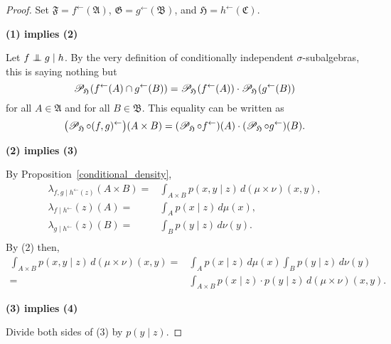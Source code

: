 \documentclass[
twoside=true,
paper=letter,
fontsize=11pt,
pagesize=auto,
leqno,
openany,
headsepline,
overfullrule,
]{scrbook}
\theoremstyle{plain}
\theoremstyle{plain}
\theoremstyle{definition}
\theoremstyle{bfnoteitalic}
\theoremstyle{bfnoteroman}
\newcommand{\sigalg}[1]{\mathfrak{#1}}
\newcommand{\cali}[1]{\mathscr{#1}}
\newcommand{\condprobsub}[2]
{\mathop{\cali{P}\hspace{-1.5pt}}\nolimits_{#2}\hspace{-1pt}\left(#1\right)}
\newcommand{\condprobop}[1]{\mathop{\cali{P}\hspace{-1pt}}\nolimits_{#1}}
\newcommand{\textsigma}{\hbox{\large{$\sigma$}}\kern-1pt}
\newcommand{\preimage}[1]{#1^{\leftarrow}}
\newcommand{\meets}{\cap}
\newcommand{\sigmaalgebra}{\sigalg{A}}
\newcommand{\sigmaalgebraii}{\sigalg{B}}
\newcommand{\sigmaalgebraiii}{\sigalg{C}}
\newcommand{\funcf}{f}
\newcommand{\funcg}{g}
\newcommand{\funch}{h}
\newcommand{\function}{f}
\newcommand{\functionii}{g}
\newcommand{\functioniii}{h}
\newcommand{\mspaceelt}{x}
\newcommand{\mspaceeltii}{y}
\newcommand{\mspaceeltiii}{z}
\newcommand{\measmu}{\mu}
\newcommand{\measnu}{\nu}
\newcommand{\measureiii}{\lambda}
\newcommand{\measlambda}{\lambda}
\newcommand{\seti}{A}
\newcommand{\setii}{B}
\newcommand{\mkernel}[3]{#1_{#2\mid#3}}
\newcommand{\condindep}[3]{#1\perp\kern-6pt\perp #2\mid #3}
\begin{document}
\begin{proof}
Set 
$\sigalg{F}=\preimage{\funcf}(\sigmaalgebra)$, 
$\sigalg{G}=\preimage{\funcg}(\sigmaalgebraii)$, and 
$\sigalg{H}=\preimage{\funch}(\sigmaalgebraiii)$.
 
\noindent
\textbf{(1) implies (2)}

Let
$\condindep{\function}{\functionii}{\functioniii}$. 
By the very definition of conditionally independent \textsigma\hyp{}subalgebras,
this is saying nothing but
\begin{equation}\label{conditional_probabilities}
\condprobsub{\preimage{\funcf}(\seti) \meets \preimage{\funcg}(\setii)}{\sigalg{H}}
=
\condprobsub{\preimage{\funcf}(\seti)}{\sigalg{H}}
\cdot
\condprobsub{\preimage{\funcg}(\setii)}{\sigalg{H}}
\end{equation}
for all $\seti\in\sigmaalgebra$ and for all $\setii\in\sigmaalgebraii$.
This equality can be written as
\begin{equation}\label{conditional_distributions}
\bigl(\condprobop{\sigalg{H}} \circ \preimage{(\funcf,\funcg)} \bigr)
(\seti\times\setii)
=
(\condprobop{\sigalg{H}}\circ \preimage{\funcf})(\seti)
\cdot
(\condprobop{\sigalg{H}}\circ \preimage{\funcg})(\setii).
\end{equation}

\noindent
\textbf{(2) implies (3)}

By Proposition~\ref{conditional_density},
\begin{align*}
\mkernel{\measureiii}{\funcf,\funcg}{\preimage{\funch}(\mspaceeltiii)}
(\seti\times\setii)
= &
\int_{\seti\times\setii}
p(\mspaceelt,\mspaceeltii\mid\mspaceeltiii)
\,d(\measmu\times\measnu)(\mspaceelt,\mspaceeltii),
\\
\mkernel{\measlambda}{\funcf}{\preimage{\funch}}(\mspaceeltiii)
(\seti)
= &
\int_\seti p(\mspaceelt\mid\mspaceeltiii)
\, d\measmu(\mspaceelt),
\\
\mkernel{\measlambda}{\funcg}{\preimage{\funch}}(\mspaceeltiii)
(\setii)
= &
\int_\setii p(\mspaceeltii\mid\mspaceeltiii)
\, d\measnu(\mspaceeltii).
\\
\end{align*}
By (2) then,
\begin{align*}
\int_{\seti\times\setii}
p(\mspaceelt,\mspaceeltii\mid\mspaceeltiii)
\,d(\measmu\times\measnu)(\mspaceelt,\mspaceeltii)
= &
\int_\seti p(\mspaceelt\mid\mspaceeltiii)
\, d\measmu(\mspaceelt)
\int_\setii p(\mspaceeltii\mid\mspaceeltiii)
\, d\measnu(\mspaceeltii)
\\
= &
\int_{\seti\times\setii}
p(\mspaceelt\mid\mspaceeltiii)\cdot
p(\mspaceeltii\mid\mspaceeltiii)
\, d(\measmu\times\measnu)(\mspaceelt,\mspaceeltii).
\end{align*}

\noindent
\textbf{(3) implies (4)}

Divide both sides of (3) by $p(\mspaceeltii\mid\mspaceeltiii)$.


\end{proof}
\end{document}
